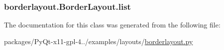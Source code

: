 \subsubsection[{list}]{\setlength{\rightskip}{0pt plus 5cm}borderlayout.\+Border\+Layout.\+list}\label{classborderlayout_1_1BorderLayout_a943d294611a2cf6de32539157f70a99f}


The documentation for this class was generated from the following file\+:\begin{DoxyCompactItemize}
\item 
packages/\+Py\+Qt-\/x11-\/gpl-\/4../examples/layouts/\hyperlink{borderlayout_8py}{borderlayout.\+py}\end{DoxyCompactItemize}
